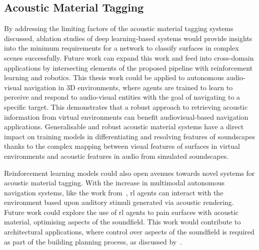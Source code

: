 \subsection{Acoustic Material Tagging}
By addressing the limiting factors of the acoustic material tagging systems discussed, ablation studies of deep learning-based systems would provide insights into the minimum requirements for a network to classify surfaces in complex scenes successfully.
Future work can expand this work and feed into cross-domain applications by intersecting elements of the proposed pipeline with reinforcement learning and robotics. This thesis work could be applied to autonomous audio-visual navigation in 3D environments, where agents are trained to learn to perceive and respond to audio-visual entities with the goal of navigating to a specific target. This demonstrates that a robust approach to retrieving acoustic information from virtual environments can benefit audiovisual-based navigation applications. Generalisable and robust acoustic material systems have a direct impact on training models in differentiating and resolving features of soundscapes thanks to the complex mapping between visual features of surfaces in virtual environments and acoustic features in audio from simulated soundscapes.\par
Reinforcement learning models could also open avenues towards novel systems for acoustic material tagging. With the increase in multimodal autonomous navigation systems, like the work from~\cite{chen2022soundspaces}, \acrshort{rl} agents can interact with the environment based upon auditory stimuli generated via acoustic rendering. Future work could explore the use of \acrshort{rl} agents to pain surfaces with acoustic material, optimising aspects of the soundfield. This work would contribute to architectural applications, where control over aspects of the soundfield is required as part of the building planning process, as discussed by~\cite{vorlander2015virtual}.\par

